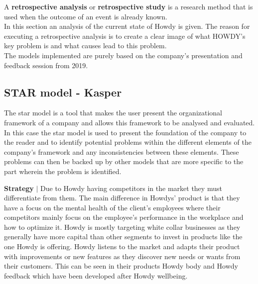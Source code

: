 

A \textbf{retrospective analysis} or \textbf{retrospective study} is a research method that is used when the outcome of an event is already known.\\
\noindent In this section an analysis of the current state of Howdy is given. The reason for executing a retrospective analysis is to create a clear image of what HOWDY’s key problem is and what causes lead to this problem.\\
\noindent The models implemented are purely based on the company’s presentation and feedback session from 2019.



\subsection{STAR model - Kasper}
The star model is a tool that makes the user present the organizational framework of a company and allows this framework to be analysed and evaluated. In this case the star model is used to present the foundation of the company to the reader and to identify potential problems within the different elements of the company’s framework and any inconsistencies between these elements. These problems can then be backed up by other models that are more specific to the part wherein the problem is identified.

\noindent \textbf{Strategy} $|$ Due to Howdy having competitors in the market they must differentiate from them. The main difference in Howdys' product is that they have a focus on the mental health of the client’s employees where their competitors mainly focus on the employee’s performance in the workplace and how to optimize it. Howdy is mostly targeting white collar businesses as they generally have more capital than other segments to invest in products like the one Howdy is offering.
Howdy listens to the market and adapts their product with improvements or new features as they discover new needs or wants from their customers. This can be seen in their products Howdy body and Howdy feedback which have been developed after Howdy wellbeing.

